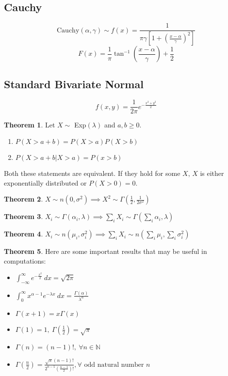 \documentclass[10pt, a4paper]{extarticle}
\theoremstyle{definition}
\newtheorem{thm}{Theorem}
\begin{document}
\subsection{Cauchy}
\[\text{Cauchy}(\alpha,\gamma)\sim f(x)=\frac{1}{\pi\gamma\left[1+\left(\frac{x-\alpha}{\gamma}\right)^2\right]}\]
\[F(x)=\frac{1}{\pi}\tan^{-1}\left(\frac{x-\alpha}{\gamma}\right)+\frac{1}{2}\]

\subsection{Standard Bivariate Normal}
\[f(x,y)=\frac{1}{2\pi}e^{-\frac{x^2+y^2}{2}}\]

\begin{thm}
	Let $X\sim$ Exp$(\lambda)$ and $a,b\geq 0$.
	\begin{enumerate}
		\item $P(X>a+b)=P(X>a)P(X>b)$
		\item $P(X>a+b|X>a)=P(x>b)$
	\end{enumerate}
	Both these statements are equivalent. If they hold for some $X$, $X$ is either exponentially distributed or $P(X>0)=0$.
\end{thm}

\begin{thm}
	$X\sim n(0,\sigma^2)\implies X^2\sim \Gamma\left(\frac{1}{2},\frac{1}{2\sigma^2}\right)$
\end{thm}

\begin{thm}
	$X_i\sim\Gamma(\alpha_i,\lambda)\implies \sum_iX_i\sim \Gamma(\sum_i\alpha_i,\lambda)$
\end{thm}

\begin{thm}
	$X_i\sim n(\mu_i,\sigma_i^2)\implies \sum_iX_i\sim n(\sum_i\mu_i,\sum_i\sigma_i^2)$
\end{thm}

\begin{thm}
	Here are some important results that may be useful in computations:
	\begin{itemize}
		\item $\int_{-\infty}^{\infty}e^{-\frac{x^2}{2}}\ dx=\sqrt{2\pi}$
		\item $\int_0^{\infty} x^{\alpha-1}e^{-\lambda x}\ dx=\frac{\Gamma(\alpha)}{\lambda^\alpha}$
		\item $\Gamma(x+1)=x\Gamma(x)$
		\item $\Gamma(1)=1,\ \Gamma\left(\frac{1}{2}\right)=\sqrt{\pi}$
		\item $\Gamma(n)=(n-1)!,\ \forall n\in\mathbb{N}$
		\item $\Gamma\left(\frac{n}{2}\right)=\frac{\sqrt{\pi}(n-1)!}{2^{n-1}\left(\frac{n-1}{2}\right)!}, \forall \text{ odd natural number }n$
	\end{itemize}
\end{thm}
\end{document}
